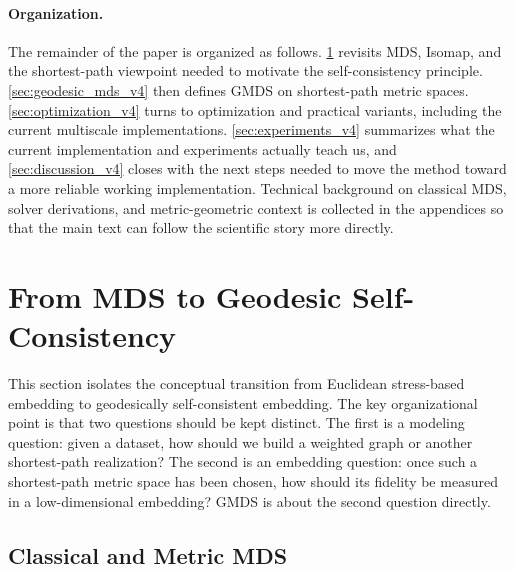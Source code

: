 \documentclass[11pt]{article}
\theoremstyle{definition}
\theoremstyle{plain}
\theoremstyle{remark}
\begin{document}
\paragraph{Organization.}

The remainder of the paper is organized as follows.
\cref{sec:background_v4} revisits MDS, Isomap, and the shortest-path
viewpoint needed to motivate the self-consistency principle.
\cref{sec:geodesic_mds_v4} then defines GMDS on shortest-path metric spaces.
\cref{sec:optimization_v4} turns to optimization and practical variants,
including the current multiscale implementations.  \cref{sec:experiments_v4}
summarizes what the current implementation and experiments actually teach us,
and \cref{sec:discussion_v4} closes with the next steps needed to move the
method toward a more reliable working implementation.  Technical background on
classical MDS, solver derivations, and metric-geometric context is collected in
the appendices so that the main text can follow the scientific story more
directly.

\section{From MDS to Geodesic Self-Consistency}
\label{sec:background_v4}
\label{sec:background}

This section isolates the conceptual transition from Euclidean stress-based
embedding to geodesically self-consistent embedding.  The key organizational
point is that two questions should be kept distinct.  The first is a modeling
question: given a dataset, how should we build a weighted graph or another
shortest-path realization?  The second is an embedding question: once such a
shortest-path metric space has been chosen, how should its fidelity be measured
in a low-dimensional embedding?  GMDS is about the second question directly.

\subsection{Classical and Metric MDS}
\label{sec:classical_mds}
\label{sec:metric_mds}
\end{document}
